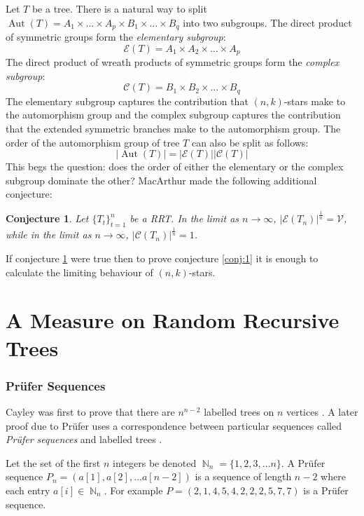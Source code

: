 \documentclass[oneside]{book} %
\newtheorem{con}[thm]{Conjecture}
\theoremstyle{definition}
\numberwithin{equation}{section}
\DeclareMathOperator{\Aut}{Aut} %
\DeclareMathOperator{\N}{\mathbb{N}}
\begin{document}
Let $T$ be a tree.  There is a natural way to split $\Aut(T)= A_{1} \times\dots\times A_{p} \times B_{1} \times \dots \times B_{q}$ into two subgroups.  The direct product of symmetric groups form the \emph{elementary subgroup}:
\[
 \mathcal{E}(T) = A_{1} \times A_2 \times \dots\times A_{p}
\]
The direct product of wreath products of symmetric groups form the \emph{complex subgroup}:
\[
 \mathcal{C}(T) =  B_{1} \times B_2 \times \dots \times B_{q}
\]
The elementary subgroup captures the contribution that $(n,k)$-stars make to the automorphism group and the complex subgroup captures the contribution that the extended symmetric branches make to the automorphism group.  The order of the automorphism group of tree $T$ can also be split as follows:
\[
\lvert \Aut(T) \rvert  =  \lvert \mathcal{E}(T) \rvert\lvert \mathcal{C}(T)\rvert 
\]
This begs the question: does the order of either the elementary or the complex subgroup dominate the other?  MacArthur \cite{Bens} made the following additional conjecture:
\begin{con}\label{conj:2}
 Let $\{T_t\}_{t=1}^{n}$ be a RRT. In the limit as $n \rightarrow \infty$, $\lvert \mathcal{E}(T_n)\rvert^{\frac{1}{n}}  = \mathcal{V}$, while in the limit as $n \rightarrow \infty$, $\lvert \mathcal{C}(T_n)\rvert^{\frac{1}{n}}  = 1$.
 
 \end{con}
If conjecture \ref{conj:2} were true then to prove conjecture \ref{conj:1} it is enough to calculate the limiting behaviour of $(n,k)$-stars.  

\chapter{A Measure on Random Recursive Trees}

\subsection{Pr\"{ufer} Sequences}\label{sec:Prufer}

Cayley was first to prove that there are $n^{n-2}$ labelled trees on $n$ vertices \cite{Cayley}. A later proof due 
to Pr\"{u}fer uses a correspondence between particular sequences called \emph{Pr\"{u}fer sequences} and labelled trees 
\cite{Bela}.  

Let the set of the first $n$ integers be denoted $\N_n = \{1,2,3,\dots n\}$.  A Pr\"{u}fer sequence $P_n = (a[1],a[2],\dots a[n-2])$
is a sequence of length $n-2$ where each entry $a[i]\in \N_n$. For example $P = (2,1,4,5,4,2,2,2,5,7,7)$ is a Pr\"{u}fer sequence. 
\end{document}
